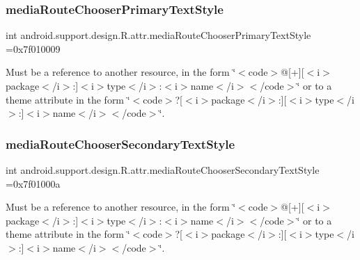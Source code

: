 \subsubsection{\texorpdfstring{media\+Route\+Chooser\+Primary\+Text\+Style}{mediaRouteChooserPrimaryTextStyle}}
{\footnotesize\ttfamily int android.\+support.\+design.\+R.\+attr.\+media\+Route\+Chooser\+Primary\+Text\+Style =0x7f010009\hspace{0.3cm}{\ttfamily [static]}}

Must be a reference to another resource, in the form \char`\"{}$<$code$>$@\mbox{[}+\mbox{]}\mbox{[}$<$i$>$package$<$/i$>$\+:\mbox{]}$<$i$>$type$<$/i$>$\+:$<$i$>$name$<$/i$>$$<$/code$>$\char`\"{} or to a theme attribute in the form \char`\"{}$<$code$>$?\mbox{[}$<$i$>$package$<$/i$>$\+:\mbox{]}\mbox{[}$<$i$>$type$<$/i$>$\+:\mbox{]}$<$i$>$name$<$/i$>$$<$/code$>$\char`\"{}. \mbox{\label{classandroid_1_1support_1_1design_1_1R_1_1attr_a5760f81809b9611d39028cfaf57e0fae}} 
\subsubsection{\texorpdfstring{media\+Route\+Chooser\+Secondary\+Text\+Style}{mediaRouteChooserSecondaryTextStyle}}
{\footnotesize\ttfamily int android.\+support.\+design.\+R.\+attr.\+media\+Route\+Chooser\+Secondary\+Text\+Style =0x7f01000a\hspace{0.3cm}{\ttfamily [static]}}

Must be a reference to another resource, in the form \char`\"{}$<$code$>$@\mbox{[}+\mbox{]}\mbox{[}$<$i$>$package$<$/i$>$\+:\mbox{]}$<$i$>$type$<$/i$>$\+:$<$i$>$name$<$/i$>$$<$/code$>$\char`\"{} or to a theme attribute in the form \char`\"{}$<$code$>$?\mbox{[}$<$i$>$package$<$/i$>$\+:\mbox{]}\mbox{[}$<$i$>$type$<$/i$>$\+:\mbox{]}$<$i$>$name$<$/i$>$$<$/code$>$\char`\"{}. \mbox{\label{classandroid_1_1support_1_1design_1_1R_1_1attr_add22a2409b6c95c625638ff026193cb2}} 
